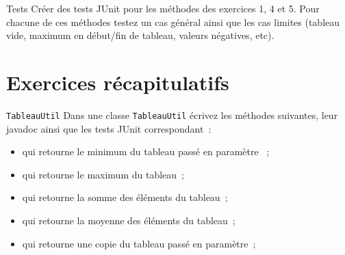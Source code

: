 \documentclass[a4paper,11pt]{style-esi/td}
\begin{document}

	\begin{Exercice}{Tests}	
		Créer des tests JUnit pour les méthodes des exercices 1, 4 et 5. Pour chacune 
		de ces méthodes testez un cas général ainsi que les cas limites (tableau vide,
		maximum en début/fin de tableau, valeurs négatives, etc).
	\end{Exercice}



\section{Exercices récapitulatifs}

	\begin{Exercice}{\texttt{TableauUtil}}	
		Dans une classe \texttt{TableauUtil} écrivez les méthodes suivantes, leur 
		javadoc ainsi que les tests JUnit correspondant~:
		\begin{itemize}
			\item {} qui retourne le minimum
				du tableau passé en paramètre ~;
			\item {} qui retourne le maximum
				du tableau~;
			\item {} qui retourne la somme
				des éléments du tableau~;
			\item {} qui retourne la
				 moyenne des éléments du tableau~;
			\item {} qui retourne une
			 copie du tableau passé en paramètre~;
		\end{itemize}
	\end{Exercice}
\end{document}
